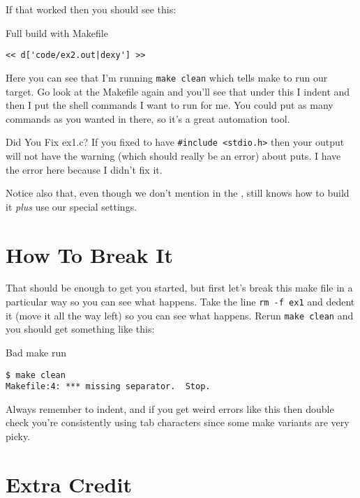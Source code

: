 If that worked then you should see this:

\begin{Terminal}{Full build with Makefile}
\begin{lstlisting}
<< d['code/ex2.out|dexy'] >>
\end{lstlisting}
\end{Terminal}

Here you can see that I'm running \verb|make clean| which tells
make to run our  target.  Go look at the Makefile
again and you'll see that under this I indent and then I put
the shell commands I want  to run for me.  You could
put as many commands as you wanted in there, so it's a great
automation tool.

\begin{aside}{Did You Fix ex1.c?}
If you fixed  to have \verb|#include <stdio.h>| then your
output will not have the warning (which should really be an error) about puts.  I have the error
here because I didn't fix it.
\end{aside}

Notice also that, even though we don't mention  in the
,  still knows how to build it \emph{plus}
use our special settings.


\section{How To Break It}

That should be enough to get you started, but first let's break this 
make file in a particular way so you can see what happens.  Take
the line \verb|rm -f ex1| and dedent it (move it all the way left)
so you can see what happens.  Rerun \verb|make clean| and you should
get something like this:

\begin{Terminal}{Bad make run}
\begin{lstlisting}
$ make clean
Makefile:4: *** missing separator.  Stop.
\end{lstlisting}
\end{Terminal}

Always remember to indent, and if you get weird errors like this
then double check you're consistently using tab characters since
some make variants are very picky.

\section{Extra Credit}

